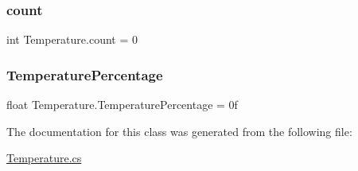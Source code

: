 \mbox{\label{class_temperature_ae3b2a2151d7587733937039a94497a19}} 
\subsubsection{\texorpdfstring{count}{count}}
{\footnotesize\ttfamily int Temperature.\+count = 0\hspace{0.3cm}{\ttfamily [static]}}

\mbox{\label{class_temperature_a631500a94ef716115d7d9a7a48e8c49b}} 
\subsubsection{\texorpdfstring{Temperature\+Percentage}{TemperaturePercentage}}
{\footnotesize\ttfamily float Temperature.\+Temperature\+Percentage = 0f\hspace{0.3cm}{\ttfamily [static]}}



The documentation for this class was generated from the following file\+:\begin{DoxyCompactItemize}
\item 
\hyperlink{_temperature_8cs}{Temperature.\+cs}\end{DoxyCompactItemize}
